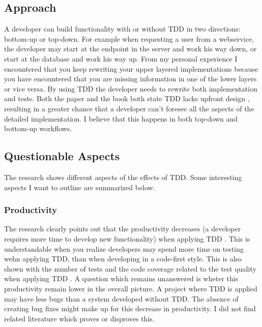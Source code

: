 \subsection*{Approach}

A developer can build functionality with or without TDD in two directions: bottom-up or top-down.
For example when requesting a user from a webservice, the developer may start at the endpoint in the server and work his way down, or start at the database and work his way up.
From my personal experience I encountered that you keep rewriting your upper layered implementations because you have encountered that you are missing information in one of the lower layers or vice versa.
By using TDD the developer needs to rewrite both implementation and tests.
Both the paper and the book both state TDD lacks upfront design \autocite[338]{SAC-J-2003-GeorgeW04} \autocite[212]{MAKING_SOFTWARE},
resulting in a greater chance that a developer can't foresee all the aspects of the detailed implementation.
I believe that this happens in both top-down and bottom-up workflows.

\subsection*{Questionable Aspects}

The research shows different aspects of the effects of TDD.
Some interesting aspects I want to outline are summarized below.

\subsubsection*{Productivity}

The research clearly points out that the productivity decreases (a developer requires more time to develop new
functionality) when applying TDD \autocite[341]{SAC-J-2003-GeorgeW04} \autocite[213]{MAKING_SOFTWARE}.
This is understandable when you realize developers may spend more time on testing wehn applying TDD, than when developing in a code-first style.
This is also shown with the number of tests and the code coverage related to the test quality when applying TDD \autocite[341]{SAC-J-2003-GeorgeW04}.
A question which remains unanswered is wheter this productivity remain lower in the overall picture.
A project where TDD is applied may have less bugs than a system developed without TDD.
The absence of creating bug fixes might make up for this decrease in productivity.
I did not find related literature which proves or disproves this.

